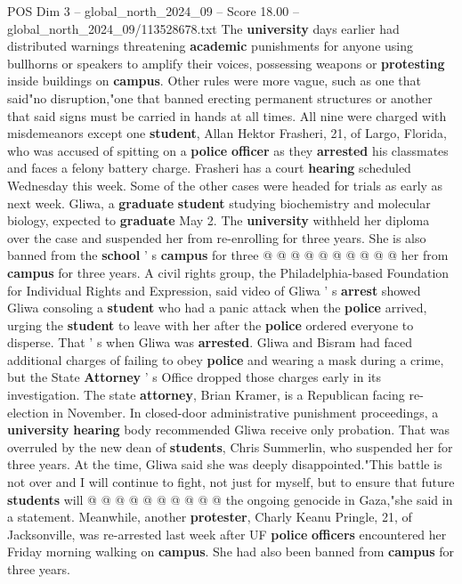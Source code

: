 \begin{textsample}{POS Dim 3 – global\_north\_2024\_09 – Score 18.00 – global\_north\_2024\_09/113528678.txt}
The \textbf{university} days earlier had distributed warnings threatening \textbf{academic} punishments for anyone using bullhorns or speakers to amplify their voices, possessing weapons or \textbf{protesting} inside buildings on \textbf{campus}.
Other rules were more vague, such as one that said"no disruption,"one that banned erecting permanent structures or another that said signs must be carried in hands at all times.
All nine were charged with misdemeanors except one \textbf{student}, Allan Hektor Frasheri, 21, of Largo, Florida, who was accused of spitting on a \textbf{police} \textbf{officer} as they \textbf{arrested} his classmates and faces a felony battery charge.
Frasheri has a court \textbf{hearing} scheduled Wednesday this week.
Some of the other cases were headed for trials as early as next week.
Gliwa, a \textbf{graduate} \textbf{student} studying biochemistry and molecular biology, expected to \textbf{graduate} May 2.
The \textbf{university} withheld her diploma over the case and suspended her from re-enrolling for three years.
She is also banned from the \textbf{school} ' s \textbf{campus} for three @ @ @ @ @ @ @ @ @ @ her from \textbf{campus} for three years.
A civil rights group, the Philadelphia-based Foundation for Individual Rights and Expression, said video of Gliwa ' s \textbf{arrest} showed Gliwa consoling a \textbf{student} who had a panic attack when the \textbf{police} arrived, urging the \textbf{student} to leave with her after the \textbf{police} ordered everyone to disperse.
That ' s when Gliwa was \textbf{arrested}.
Gliwa and Bisram had faced additional charges of failing to obey \textbf{police} and wearing a mask during a crime, but the State \textbf{Attorney} ' s Office dropped those charges early in its investigation.
The state \textbf{attorney}, Brian Kramer, is a Republican facing re-election in November.
In closed-door administrative punishment proceedings, a \textbf{university} \textbf{hearing} body recommended Gliwa receive only probation.
That was overruled by the new dean of \textbf{students}, Chris Summerlin, who suspended her for three years.
At the time, Gliwa said she was deeply disappointed."This battle is not over and I will continue to fight, not just for myself, but to ensure that future \textbf{students} will @ @ @ @ @ @ @ @ @ @ the ongoing genocide in Gaza,"she said in a statement.
Meanwhile, another \textbf{protester}, Charly Keanu Pringle, 21, of Jacksonville, was re-arrested last week after UF \textbf{police} \textbf{officers} encountered her Friday morning walking on \textbf{campus}.
She had also been banned from \textbf{campus} for three years.

\end{textsample}
